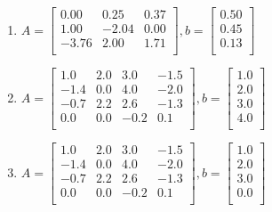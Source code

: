 \documentclass[a4paper]{article}
\begin{document}
\begin{enumerate}
\begin{enumerate}
  \item %
    $A = \begin{bmatrix}
      0.00 & 0.25 & 0.37\\
      1.00 & -2.04 & 0.00\\
      -3.76 & 2.00 & 1.71\\
      \end{bmatrix},
      b= \begin{bmatrix}
        0.50\\
        0.45\\
        0.13\\
      \end{bmatrix}$

  \item %
    $A = \begin{bmatrix}
      1.0 & 2.0 & 3.0 & -1.5\\
      -1.4 & 0.0 & 4.0 & -2.0\\
      -0.7 & 2.2 & 2.6 & -1.3\\
      0.0 & 0.0 & -0.2 & 0.1\\
      \end{bmatrix},
      b= \begin{bmatrix}
        1.0\\
        2.0\\
        3.0\\
        4.0\\
      \end{bmatrix}$

  \item %
    $A = \begin{bmatrix}
      1.0 & 2.0 & 3.0 & -1.5\\
      -1.4 & 0.0 & 4.0 & -2.0\\
      -0.7 & 2.2 & 2.6 & -1.3\\
      0.0 & 0.0 & -0.2 & 0.1\\
      \end{bmatrix},
      b= \begin{bmatrix}
        1.0\\
        2.0\\
        3.0\\
        0.0\\
      \end{bmatrix}$


  \end{enumerate}

\end{enumerate}
\end{document}
